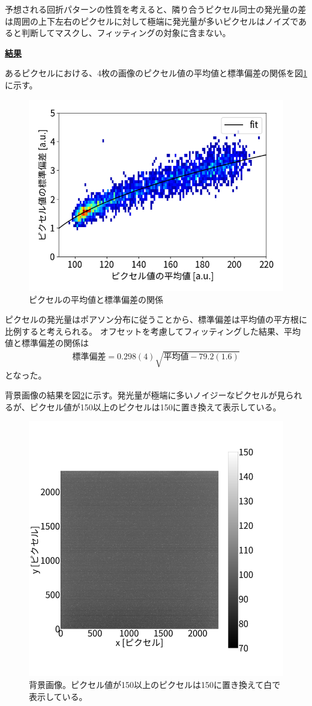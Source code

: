 \documentclass[a4paper,11pt,uplatex]{jsbook}
\begin{document}
予想される回折パターンの性質を考えると、隣り合うピクセル同士の発光量の差は周囲の上下左右のピクセルに対して極端に発光量が多いピクセルはノイズであると判断してマスクし、フィッティングの対象に含まない。

\noindent \textbf{\underline{結果}}\par
あるピクセルにおける、4枚の画像のピクセル値の平均値と標準偏差の関係を図\ref{pixel}に示す。
\begin{figure}[h]
  \centering
  \includegraphics[width=0.8\linewidth]{image/4-pixel.png}
  \caption{ピクセルの平均値と標準偏差の関係}\label{pixel}
\end{figure}

ピクセルの発光量はポアソン分布に従うことから、標準偏差は平均値の平方根に比例すると考えられる。
オフセットを考慮してフィッティングした結果、平均値と標準偏差の関係は
\begin{eqnarray}
  \text{標準偏差} = 0.298(4) \sqrt{\text{平均値} - 79.2(1.6) } 
\end{eqnarray}
となった。

背景画像の結果を図\ref{BG}に示す。発光量が極端に多いノイジーなピクセルが見られるが、ピクセル値が150以上のピクセルは150に置き換えて表示している。
\begin{figure}[h]
  \centering
  \includegraphics[width=0.8\linewidth]{image/4-BG.png}
  \caption[背景画像]{背景画像。ピクセル値が150以上のピクセルは150に置き換えて白で表示している。}\label{BG}
\end{figure}
\end{document}
